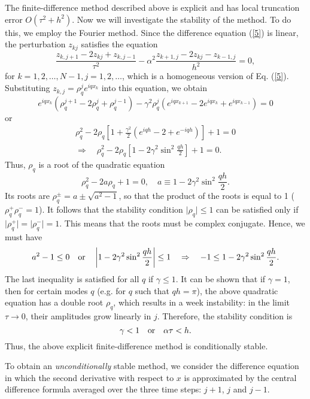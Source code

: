 The finite-difference method described
above is explicit and has local truncation error
$O(\tau^{2}+h^{2})$. Now we will investigate the stability of the
method. To do this, we employ the Fourier method. Since the
difference equation (\ref{5}) is linear, the perturbation $z_{kj}$
satisfies the equation
\[
\frac{z_{k,j+1}-2z_{kj}+z_{k,j-1}}{\tau^{2}}-\alpha^{2}
\frac{z_{k+1, j}-2z_{kj}-z_{k-1,j}}{h^{2}}=0, 
\]
for $k=1,2, \dots,N-1, j=1,2, \dots$,
which is a homogeneous version of Eq. (\ref{5}). Substituting
$z_{k,j}=\rho_{q}^{j}e^{iqx_{k}}$ into this equation, we obtain
\[
e^{iqx_{k}}\left(\rho_{q}^{j+1}-2\rho_{q}^{j}+\rho_{q}^{j-1}\right)-
\gamma^{2}\rho_{q}^{j}
\left(e^{iqx_{k+1}}-2e^{iqx_{k}}+e^{iqx_{k-1}}\right)=0
\]
or
\begin{multline*}
\rho_{q}^{2}-2\rho_{q}\left[1+
\frac{\gamma^{2}}{2}\left(e^{iqh}-2+e^{-iqh}\right)\right]+1=0\\
\Rightarrow \quad \rho_{q}^{2}-2\rho_{q}\left[1-
2\gamma^{2}\sin^{2} \frac{qh}{2}\right]+1=0.
\end{multline*}
Thus, $\rho_{q}$ is a root of the quadratic equation
\[
\rho_{q}^{2}-2a\rho_{q}+1=0, \quad a\equiv 1- 2\gamma^{2}\sin^{2}
\frac{qh}{2}.
\]
Its roots are $\rho^{\pm}_{q}=a\pm\sqrt{a^{2}-1}$, so that the
product of the roots is equal to 1 ($\rho_{q}^{+}\rho_{q}^{-}=1$).
It follows that the stability condition $\vert\rho_{q}\vert \leq
1$ can be satisfied only if $\vert\rho_{q}^{+}\vert
=\vert\rho_{q}^{-}\vert = 1$. This means that the roots must be
complex conjugate. Hence, we must have
\[
a^{2}-1\leq 0 \quad \hbox{or} \quad \left\vert 1-
2\gamma^{2}\sin^{2}\frac{qh}{2}\right\vert \leq 1  \quad
\Rightarrow \quad -1\leq 1- 2\gamma^{2}\sin^{2}\frac{qh}{2}.
\]
The last inequality is satisfied for all $q$ if $\gamma\leq 1$. It
can be shown that if $\gamma=1$, then for certain modes $q$ (e.g.
for $q$ such that $qh=\pi$), the above quadratic equation has a
double root $\rho_{q}$, which results in a week instability: in
the limit $\tau\to 0$, their amplitudes grow linearly in $j$.
Therefore, the stability condition is
\[
\gamma <1 \quad \hbox{or} \quad \alpha\tau < h.
\]
Thus, the above explicit finite-difference method is conditionally
stable.


   
To obtain an {\it unconditionally} stable
method, we consider the difference equation in which the second
derivative with respect to $x$ is approximated by the central
difference formula averaged over the three time steps: $j+1$, $j$
and $j-1$.

